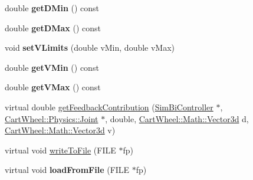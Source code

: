 \begin{DoxyCompactItemize}
\item 
\hypertarget{classCartWheel_1_1Core_1_1LinearBalanceFeedback_a07833526fe91386bb11837b83910af77}{
double {\bfseries getDMin} () const }
\label{classCartWheel_1_1Core_1_1LinearBalanceFeedback_a07833526fe91386bb11837b83910af77}

\item 
\hypertarget{classCartWheel_1_1Core_1_1LinearBalanceFeedback_af977dc92e110b75e4f686c7dd252c8c7}{
double {\bfseries getDMax} () const }
\label{classCartWheel_1_1Core_1_1LinearBalanceFeedback_af977dc92e110b75e4f686c7dd252c8c7}

\item 
\hypertarget{classCartWheel_1_1Core_1_1LinearBalanceFeedback_a0257676f847aa8e3bf2602e1fb7e3832}{
void {\bfseries setVLimits} (double vMin, double vMax)}
\label{classCartWheel_1_1Core_1_1LinearBalanceFeedback_a0257676f847aa8e3bf2602e1fb7e3832}

\item 
\hypertarget{classCartWheel_1_1Core_1_1LinearBalanceFeedback_aa1aa6264e66115a4acc0bb2d62c9c8ea}{
double {\bfseries getVMin} () const }
\label{classCartWheel_1_1Core_1_1LinearBalanceFeedback_aa1aa6264e66115a4acc0bb2d62c9c8ea}

\item 
\hypertarget{classCartWheel_1_1Core_1_1LinearBalanceFeedback_a8ff3089b5e40dd7a729b31376569faf2}{
double {\bfseries getVMax} () const }
\label{classCartWheel_1_1Core_1_1LinearBalanceFeedback_a8ff3089b5e40dd7a729b31376569faf2}

\item 
virtual double \hyperlink{classCartWheel_1_1Core_1_1LinearBalanceFeedback_a628981fc632cb32cde15da207f1320e5}{getFeedbackContribution} (\hyperlink{classCartWheel_1_1Core_1_1SimBiController}{SimBiController} $\ast$, \hyperlink{classCartWheel_1_1Physics_1_1Joint}{CartWheel::Physics::Joint} $\ast$, double, \hyperlink{classCartWheel_1_1Math_1_1Vector3d}{CartWheel::Math::Vector3d} d, \hyperlink{classCartWheel_1_1Math_1_1Vector3d}{CartWheel::Math::Vector3d} v)
\item 
virtual void \hyperlink{classCartWheel_1_1Core_1_1LinearBalanceFeedback_a31e399f13c10db166a451229759aef8e}{writeToFile} (FILE $\ast$fp)
\item 
\hypertarget{classCartWheel_1_1Core_1_1LinearBalanceFeedback_abba7a5071c69b924394ee6814d4e3742}{
virtual void {\bfseries loadFromFile} (FILE $\ast$fp)}
\label{classCartWheel_1_1Core_1_1LinearBalanceFeedback_abba7a5071c69b924394ee6814d4e3742}

\end{DoxyCompactItemize}
